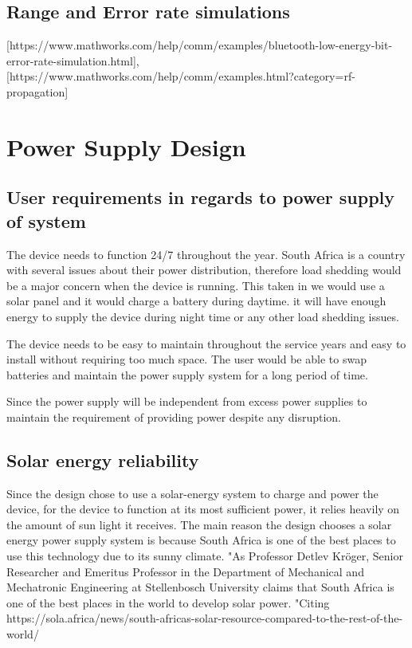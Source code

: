 \documentclass[12pt]{article}
\begin{document}
\subsection{Range and Error rate simulations}
[https://www.mathworks.com/help/comm/examples/bluetooth-low-energy-bit-error-rate-simulation.html], %
[https://www.mathworks.com/help/comm/examples.html?category=rf-propagation]%

\section{Power Supply Design}
\subsection{User requirements in regards to power supply of system}
The device needs to function 24/7 throughout the year. South Africa is a country with several issues about their power distribution, therefore load shedding would be a major concern when the device is running. This taken in we would use a solar panel and it would charge a battery during daytime. it will have enough energy to supply the device during night time or any other load shedding issues.

The device needs to be easy to maintain throughout the service years and easy to install without requiring too much space. The user would be able to swap batteries and maintain the power supply system for a long period of time.

Since the power supply will be independent from  excess power supplies to maintain the requirement of providing power despite any disruption.

\subsection{Solar energy reliability}
Since the design chose to use a solar-energy system to charge and power the device, for the device to function at its most sufficient power, it relies heavily on the amount of sun light it receives. The main reason the design chooses a solar energy power supply system is because South Africa is one of the best places to use this technology due to its sunny climate. "As Professor Detlev Kröger, Senior Researcher and Emeritus Professor in the Department of Mechanical and Mechatronic Engineering at Stellenbosch University claims that South Africa is one of the best places in the world to develop solar power. "Citing
https://sola.africa/news/south-africas-solar-resource-compared-to-the-rest-of-the-world/
\end{document}
